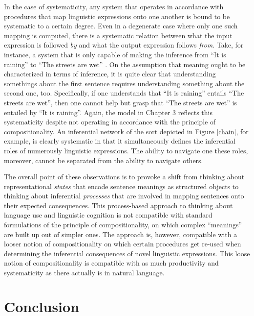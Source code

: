 In the case of systematicity, any system that operates in accordance with procedures that map linguistic expressions onto one another is bound to be systematic to a certain degree. Even in a degenerate case where only one such mapping is computed, there is a systematic relation between what the input expression is followed \textit{by} and what the output expression follows \textit{from}. Take, for instance, a system that is only capable of making the inference from ``It is raining'' to ``The streets are wet'' \citep[][p. 313]{Sellars:1954}. On the assumption that meaning ought to be characterized in terms of inference, it is quite clear that understanding somethings about the first sentence requires understanding something about the second one, too. Specifically, if one understands that ``It is raining'' entails ``The streets are wet'', then one cannot help but grasp that ``The streets are wet'' is entailed by ``It is raining''. Again, the model in Chapter 3 reflects this systematicity despite not operating in accordance with the principle of compositionality. An inferential network of the sort depicted in Figure \ref{chain}, for example, is clearly systematic in that it simultaneously defines the inferential roles of numerously linguistic expressions. The ability to navigate one these roles, moreover, cannot be separated from the ability to navigate others. 

The overall point of these observations is to provoke a shift from thinking about representational \textit{states} that encode sentence meanings as structured objects to thinking about inferential \textit{processes} that are involved in mapping sentences onto their expected consequences. This process-based approach to thinking about language use and linguistic cognition is not compatible with standard formulations of the principle of compositionality, on which complex ``meanings'' are built up out of simpler ones. The approach is, however, compatible with a looser notion of compositionality on which certain procedures get re-used when determining the inferential consequences of novel linguistic expressions. This loose notion of compositionality is compatible with as much productivity and systematicity as there actually is in natural language. 

\section{Conclusion}

